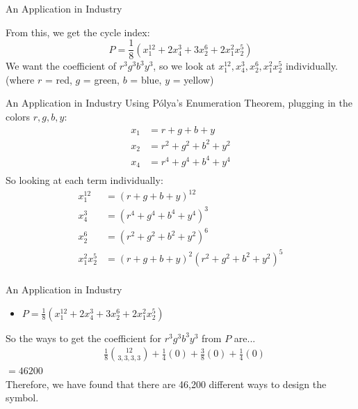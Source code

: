 \documentclass{beamer}
\begin{document}
\begin{frame}{An Application in Industry}

From this, we get the cycle index:\\
\[P = \frac{1}{8}(x_1^{12}+2x_4^3 +3x_2^6 +2x_1^2 x_2^5)\]
We want the coefficient of $r^3g^3b^3y^3$, so we look at
$x_1^{12},x_4^{3},x_2^{6},x_1^{2} x_2^5$ individually.\\
(where $r$ = red, $g$ = green, $b$ = blue, $y$ = yellow)
\end{frame}

\begin{frame}{An Application in Industry}
Using Pólya's Enumeration Theorem, plugging in the colors $r,g,b,y$:\\
\begin{align*}
x_1 &= r+g+b+y\\
x_2 &=r^2+g^2+b^2+y^2\\
x_4 &=r^4+g^4+b^4+y^4\\
\end{align*}
So looking at each term individually:
\begin{align*}
x_1^{12} &= (r+g+b+y)^{12}\\
x_4^3 &=(r^4+g^4+b^4+y^4)^3\\
x_2^6 &=(r^2+g^2+b^2+y^2)^6\\
x_1^{2}x_2^5 &= (r+g+b+y)^2(r^2+g^2+b^2+y^2)^5\\
\end{align*}
\end{frame}

\begin{frame}{An Application in Industry}
\begin{itemize}
\item $P = \frac{1}{8}(x_1^{12}+2x_4^3 +3x_2^6 +2x_1^2 x_2^5)$
\end{itemize}
So the ways to get the coefficient for $r^3g^3b^3y^3$ from $P$ are...\\
\begin{align*}
&\frac{1}{8}{{12}\choose{3,3,3,3}}+\frac{1}{4}(0) + \frac{3}{8}(0) + \frac{1}{4}(0)
\end{align*}
$=46200$\\
\vspace{40pt}
Therefore, we have found that there are 46,200 different ways to design the symbol.
\end{frame}
\end{document}
